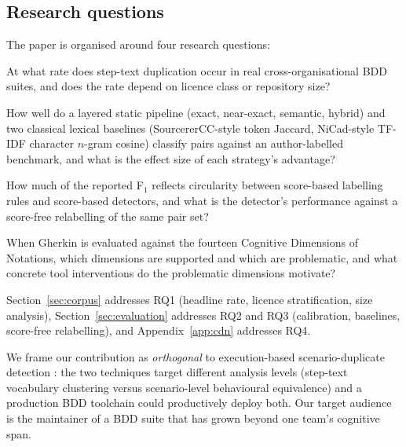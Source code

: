 \documentclass[11pt,a4paper]{article}
\begin{document}
\subsection*{Research questions}

The paper is organised around four research questions:

\begin{description}[leftmargin=2.2em,labelindent=0em,style=nextline]
\item[RQ1 (prevalence).] At what rate does step-text duplication
occur in real cross-organisational BDD suites, and does the rate
depend on licence class or repository size?
\item[RQ2 (detection quality).] How well do a layered static
pipeline (exact, near-exact, semantic, hybrid) and two classical
lexical baselines (SourcererCC-style token Jaccard, NiCad-style
TF-IDF character $n$-gram cosine) classify pairs against an
author-labelled benchmark, and what is the effect size of each
strategy's advantage?
\item[RQ3 (methodological coupling).] How much of the reported
F$_1$ reflects circularity between score-based labelling rules and
score-based detectors, and what is the detector's performance
against a score-free relabelling of the same pair set?
\item[RQ4 (cognitive fit).] When Gherkin is evaluated against the
fourteen Cognitive Dimensions of Notations, which dimensions are
supported and which are problematic, and what concrete tool
interventions do the problematic dimensions motivate?
\end{description}

Section~\ref{sec:corpus} addresses RQ1 (headline rate, licence
stratification, size analysis), Section~\ref{sec:evaluation}
addresses RQ2 and RQ3 (calibration, baselines, score-free
relabelling), and Appendix~\ref{app:cdn} addresses RQ4.

We frame our contribution as \emph{orthogonal} to execution-based
scenario-duplicate detection \citep{binamungu2018vst}: the two
techniques target different analysis levels (step-text vocabulary
clustering versus scenario-level behavioural equivalence) and a
production BDD toolchain could productively deploy both. Our target
audience is the maintainer of a BDD suite that has grown beyond one
team's cognitive span.
\end{document}
